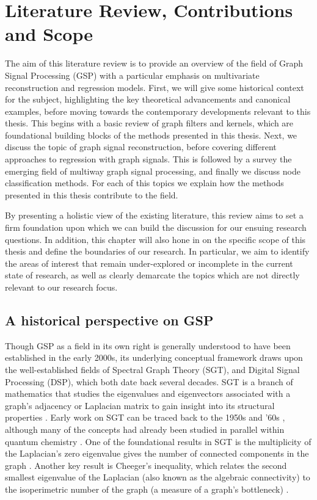 \chapter{Literature Review, Contributions and Scope} 

\label{chap:lit_review} 


The aim of this literature review is to provide an overview of the field of Graph Signal Processing (GSP) with a particular emphasis on multivariate reconstruction and regression models. First, we will give some historical context for the subject, highlighting the key theoretical advancements and canonical examples, before moving towards the contemporary developments relevant to this thesis. This begins with a basic review of graph filters and kernels, which are foundational building blocks of the methods presented in this thesis. Next, we discuss the topic of graph signal reconstruction, before covering different approaches to regression with graph signals. This is followed by a survey the emerging field of multiway graph signal processing, and finally we discuss node classification methods. For each of this topics we explain how the methods presented in this thesis contribute to the field. 

By presenting a holistic view of the existing literature, this review aims to set a firm foundation upon which we can build the discussion for our ensuing research questions. In addition, this chapter will also hone in on the specific scope of this thesis and define the boundaries of our research. In particular, we aim to identify the areas of interest that remain under-explored or incomplete in the current state of research, as well as clearly demarcate the topics which are not directly relevant to our research focus. 


\section{A historical perspective on GSP}

Though GSP as a field in its own right is generally understood to have been established in the early 2000s, its underlying conceptual framework draws upon the well-established fields of Spectral Graph Theory (SGT), and Digital Signal Processing (DSP), which both date back several decades. SGT is a branch of mathematics that studies the eigenvalues and eigenvectors associated with a graph's adjacency or Laplacian matrix to gain insight into its structural properties \citep{Chung1997}. Early work on SGT can be traced back to the 1950s and '60s \citep{Collatz1957,Hoffman1969}, although many of the concepts had already been studied in parallel within quantum chemistry \citep{Huckel1931}. One of the foundational results in SGT is the multiplicity of the Laplacian's zero eigenvalue gives the number of connected components in the graph \citep{Cvetkovic1980}. Another key result is Cheeger's inequality, which relates the second smallest eigenvalue of the Laplacian (also known as the algebraic connectivity) to the isoperimetric number of the graph (a measure of a graph's bottleneck) \citep{Cheeger1971}. 


